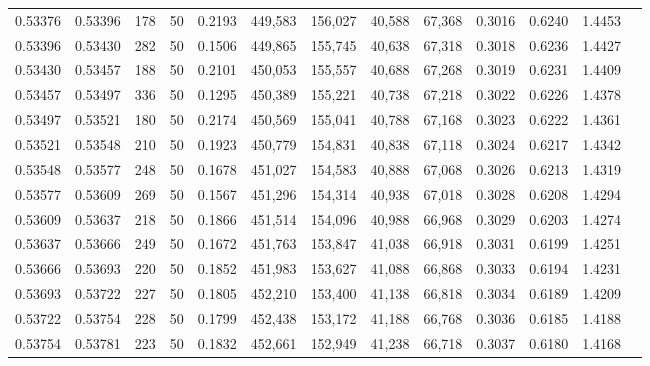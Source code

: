 \begin{tabular}{rrrrrrrrrrrrr}
0.53376 & 0.53396 &   178 &  50 &                                     0.2193 & 449,583 & 156,027 &  40,588 &  67,368 & 0.3016 & 0.6240 & 1.4453 \\
0.53396 & 0.53430 &   282 &  50 &                                     0.1506 & 449,865 & 155,745 &  40,638 &  67,318 & 0.3018 & 0.6236 & 1.4427 \\
0.53430 & 0.53457 &   188 &  50 &                                     0.2101 & 450,053 & 155,557 &  40,688 &  67,268 & 0.3019 & 0.6231 & 1.4409 \\
0.53457 & 0.53497 &   336 &  50 &                                     0.1295 & 450,389 & 155,221 &  40,738 &  67,218 & 0.3022 & 0.6226 & 1.4378 \\
0.53497 & 0.53521 &   180 &  50 &                                     0.2174 & 450,569 & 155,041 &  40,788 &  67,168 & 0.3023 & 0.6222 & 1.4361 \\
0.53521 & 0.53548 &   210 &  50 &                                     0.1923 & 450,779 & 154,831 &  40,838 &  67,118 & 0.3024 & 0.6217 & 1.4342 \\
0.53548 & 0.53577 &   248 &  50 &                                     0.1678 & 451,027 & 154,583 &  40,888 &  67,068 & 0.3026 & 0.6213 & 1.4319 \\
0.53577 & 0.53609 &   269 &  50 &                                     0.1567 & 451,296 & 154,314 &  40,938 &  67,018 & 0.3028 & 0.6208 & 1.4294 \\
0.53609 & 0.53637 &   218 &  50 &                                     0.1866 & 451,514 & 154,096 &  40,988 &  66,968 & 0.3029 & 0.6203 & 1.4274 \\
0.53637 & 0.53666 &   249 &  50 &                                     0.1672 & 451,763 & 153,847 &  41,038 &  66,918 & 0.3031 & 0.6199 & 1.4251 \\
0.53666 & 0.53693 &   220 &  50 &                                     0.1852 & 451,983 & 153,627 &  41,088 &  66,868 & 0.3033 & 0.6194 & 1.4231 \\
0.53693 & 0.53722 &   227 &  50 &                                     0.1805 & 452,210 & 153,400 &  41,138 &  66,818 & 0.3034 & 0.6189 & 1.4209 \\
0.53722 & 0.53754 &   228 &  50 &                                     0.1799 & 452,438 & 153,172 &  41,188 &  66,768 & 0.3036 & 0.6185 & 1.4188 \\
0.53754 & 0.53781 &   223 &  50 &                                     0.1832 & 452,661 & 152,949 &  41,238 &  66,718 & 0.3037 & 0.6180 & 1.4168 \\

\end{tabular}
